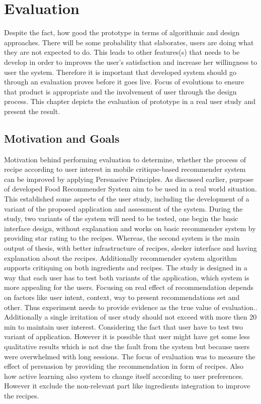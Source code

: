 \chapter{Evaluation}
Despite the fact, how good the prototype in terms of algorithmic and design approaches. There will be some probability that elaborates, users are doing what they are not expected to do.  This leads to other features(s) that needs to be develop in order to improves the user’s satisfaction and increase her willingness to user the system. Therefore it is important that developed system should go through an evaluation proves before it goes live. Focus of evolutions to ensure that product is appropriate and the involvement of user through the design process. This chapter depicts the evaluation of prototype in a real user study and present the result.
\section{Motivation and Goals}
Motivation behind performing evaluation to determine, whether the process of recipe according to user interest in mobile critique-based recommender system can be improved by applying Persuasive Principles. As discussed earlier, purpose of developed Food Recommender System aim to be used in a real world situation. This established some aspects of the user study, including the development of a variant of the proposed application and assessment of the system.\newline
During the study, two variants of the system will need to be tested, one begin the basic interface design, without explanation and works on basic recommender system by providing star rating to the recipes. Whereas, the second system is the main output of thesis, with better infrastructure of recipes, sleeker interface and having explanation about the recipes. Additionally recommender system algorithm supports critiquing on both ingredients and recipes.\newline 
The study is designed in a way that each user has to test both variants of the application, which system is more appealing for the users. Focusing on real effect of recommendation depends on factors like user intent, context, way to present recommendations set and other. Thus experiment needs to provide evidence as the true value of evaluation.\cite{shani2011evaluating}. Additionally a single irritation of user study should not exceed with more then 20 min to maintain user interest. Considering the fact that user have to test two variant of application. However it is possible that user might have get some less qualitative results which is not due the fault from the system but because users were overwhelmed with long sessions.  \newline
The focus of evaluation was to measure the effect of persuasion by providing the recommendation in form of recipes. Also how active learning also system to change itself according to user preferences. However it exclude the non-relevant part like ingredients integration to improve the recipes.
